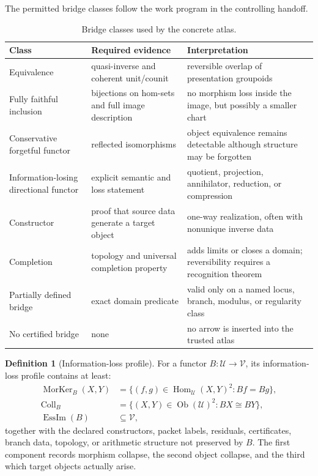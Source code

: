 \documentclass[11pt]{article}
\theoremstyle{definition}
\newtheorem{definition}[theorem]{Definition}
\theoremstyle{remark}
\DeclareMathOperator{\Hom}{Hom}
\begin{document}
The permitted bridge classes follow the work program in the controlling handoff.

\begin{table}[htbp]
\centering
\caption{Bridge classes used by the concrete atlas.}
\label{tab:bridge-classes}
\small
\begin{tabularx}{\textwidth}{@{}L{0.22\textwidth}L{0.20\textwidth}Y@{}}
\toprule
Class & Required evidence & Interpretation\\
\midrule
Equivalence & quasi-inverse and coherent unit/counit & reversible overlap of presentation groupoids\\
Fully faithful inclusion & bijections on hom-sets and full image description & no morphism loss inside the image, but possibly a smaller chart\\
Conservative forgetful functor & reflected isomorphisms & object equivalence remains detectable although structure may be forgotten\\
Information-losing directional functor & explicit semantic and loss statement & quotient, projection, annihilator, reduction, or compression\\
Constructor & proof that source data generate a target object & one-way realization, often with nonunique inverse data\\
Completion & topology and universal completion property & adds limits or closes a domain; reversibility requires a recognition theorem\\
Partially defined bridge & exact domain predicate & valid only on a named locus, branch, modulus, or regularity class\\
No certified bridge & none & no arrow is inserted into the trusted atlas\\
\bottomrule
\end{tabularx}
\end{table}

\begin{definition}[Information-loss profile]
\label{def:information-loss-profile}
For a functor \(B:\mathcal U\to\mathcal V\), its information-loss profile contains at least:
\begin{align*}
\operatorname{MorKer}_B(X,Y)
&=
\{(f,g)\in\Hom_{\mathcal U}(X,Y)^2:Bf=Bg\},\\
\operatorname{Coll}_B
&=
\{(X,Y)\in\operatorname{Ob}(\mathcal U)^2:BX\cong BY\},\\
\operatorname{EssIm}(B)
&\subseteq\mathcal V,
\end{align*}
together with the declared constructors, packet labels, residuals, certificates, branch data, topology, or arithmetic structure not preserved by \(B\).  The first component records morphism collapse, the second object collapse, and the third which target objects actually arise.
\end{definition}
\end{document}
